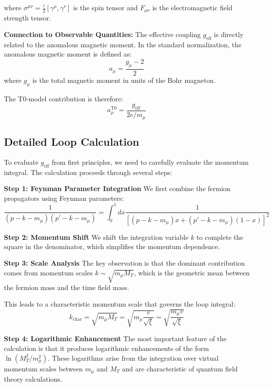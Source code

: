 \documentclass[12pt,a4paper]{article}
\newcommand{\xigeom}{\xi}
\begin{document}
	where $\sigma^{\mu\nu} = \frac{i}{2}[\gamma^\mu, \gamma^\nu]$ is the spin tensor and $F_{\mu\nu}$ is the electromagnetic field strength tensor.
	
	\textbf{Connection to Observable Quantities:} The effective coupling $g_{\text{eff}}$ is directly related to the anomalous magnetic moment. In the standard normalization, the anomalous magnetic moment is defined as:
	\begin{equation}
		a_\mu = \frac{g_\mu - 2}{2}
	\end{equation}
	where $g_\mu$ is the total magnetic moment in units of the Bohr magneton.
	
	The T0-model contribution is therefore:
	\begin{equation}
		a_\mu^{\text{T0}} = \frac{g_{\text{eff}}}{2e/m_\mu}
	\end{equation}
	
	\subsection{Detailed Loop Calculation}
	
	To evaluate $g_{\text{eff}}$ from first principles, we need to carefully evaluate the momentum integral. The calculation proceeds through several steps:
	
	\textbf{Step 1: Feynman Parameter Integration}
	We first combine the fermion propagators using Feynman parameters:
	\begin{equation}
		\frac{1}{(p-k-m_\mu)(p'-k-m_\mu)} = \int_0^1 dx \frac{1}{[(p-k-m_\mu)x + (p'-k-m_\mu)(1-x)]^2}
	\end{equation}
	
	\textbf{Step 2: Momentum Shift}
	We shift the integration variable $k$ to complete the square in the denominator, which simplifies the momentum dependence.
	
	\textbf{Step 3: Scale Analysis}
	The key observation is that the dominant contribution comes from momentum scales $k \sim \sqrt{m_\mu M_T}$, which is the geometric mean between the fermion mass and the time field mass.
	
	This leads to a characteristic momentum scale that governs the loop integral:
	\begin{equation}
		k_{\text{char}} = \sqrt{m_\mu M_T} = \sqrt{m_\mu \frac{v}{\sqrt{\xigeom}}} = \sqrt{\frac{m_\mu v}{\sqrt{\xigeom}}}
	\end{equation}
	
	\textbf{Step 4: Logarithmic Enhancement}
	The most important feature of the calculation is that it produces logarithmic enhancements of the form $\ln(M_T^2/m_\mu^2)$. These logarithms arise from the integration over virtual momentum scales between $m_\mu$ and $M_T$ and are characteristic of quantum field theory calculations.
	
\end{document}
